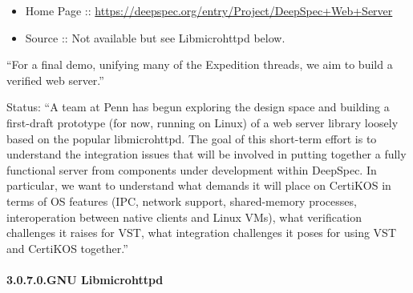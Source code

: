 \documentclass[12pt,twoside]{article}
\begin{document}
\begin{itemize}[noitemsep,topsep=\mdcompacttopsep]%

\item{}Home Page :: \href{https://deepspec.org/entry/Project/DeepSpec+Web+Server}{{\ttfamily https://\hspace{0pt}deepspec.\hspace{0pt}org/\hspace{0pt}entry/\hspace{0pt}Project/\hspace{0pt}DeepSpec+\hspace{0pt}Web+\hspace{0pt}Server}}%

\item{}Source :: Not available but see Libmicrohttpd below.%
\end{itemize}%

\noindent{}\textquotedblleft{}For a final demo, unifying many of the Expedition threads, we aim to
build a verified web server.\textquotedblright{}%

Status: \textquotedblleft{}A team at Penn has begun exploring the design space and
building a first-draft prototype (for now, running on Linux) of a web
server library loosely based on the popular libmicrohttpd.  The goal
of this short-term effort is to understand the integration issues that
will be involved in putting together a fully functional server from
components under development within DeepSpec.  In particular, we want
to understand what demands it will place on CertiKOS in terms of OS
features (IPC, network support, shared-memory processes,
interoperation between native clients and Linux VMs), what
verification challenges it raises for VST, what integration challenges
it poses for using VST and CertiKOS together.\textquotedblright{}%

\paragraph{3.0.7.0.\hspace*{0.5em}GNU Libmicrohttpd}\label{sec-gnu-libmicrohttpd}%
\end{document}
